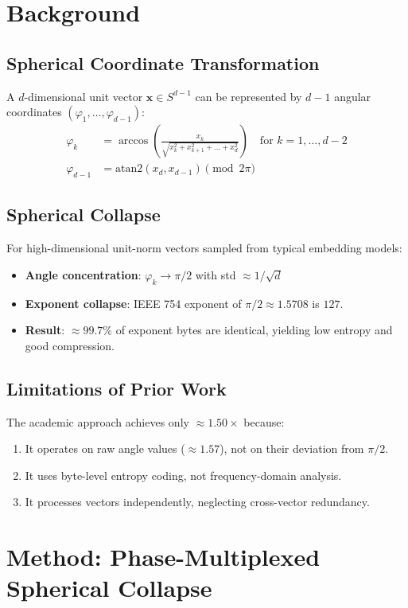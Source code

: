 \documentclass[11pt,a4paper]{article}
\begin{document}
\section{Background}
\label{sec:background}
\subsection{Spherical Coordinate Transformation}
A $d$-dimensional unit vector $\mathbf{x} \in S^{d-1}$ can be represented by $d-1$ angular coordinates $(\varphi_1, \dots, \varphi_{d-1})$:
\begin{align}
\varphi_k &= \arccos\left(\frac{x_k}{\sqrt{x_k^2 + x_{k+1}^2 + \dots + x_d^2}}\right) \quad \text{for } k = 1, \dots, d-2 \\
\varphi_{d-1} &= \text{atan2}(x_d, x_{d-1}) \pmod{2\pi}
\end{align}

\subsection{Spherical Collapse}
For high-dimensional unit-norm vectors sampled from typical embedding models:
\begin{itemize}
    \item \textbf{Angle concentration}: $\varphi_k \rightarrow \pi/2$ with std $\approx 1/\sqrt{d}$
    \item \textbf{Exponent collapse}: IEEE 754 exponent of $\pi/2 \approx 1.5708$ is $127$.
    \item \textbf{Result}: $\approx 99.7\%$ of exponent bytes are identical, yielding low entropy and good compression.
\end{itemize}

\subsection{Limitations of Prior Work}
The academic approach achieves only $\approx 1.50\times$ because:
\begin{enumerate}
    \item It operates on raw angle values ($\approx 1.57$), not on their deviation from $\pi/2$.
    \item It uses byte-level entropy coding, not frequency-domain analysis.
    \item It processes vectors independently, neglecting cross-vector redundancy.
\end{enumerate}

\section{Method: Phase-Multiplexed Spherical Collapse}
\label{sec:method}
\end{document}
